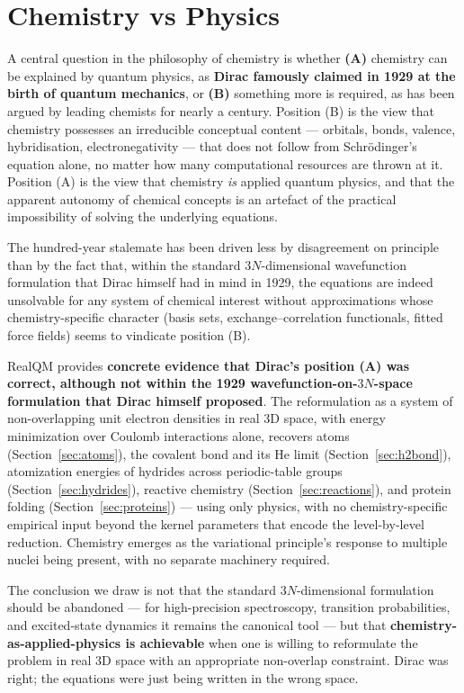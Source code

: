 \documentclass[11pt]{article}
\begin{document}
\section{Chemistry vs Physics}\label{sec:chemvphys}

A central question in the philosophy of chemistry is whether \textbf{(A)} chemistry can be explained by quantum physics, as \textbf{Dirac famously claimed in 1929 at the birth of quantum mechanics}, or \textbf{(B)} something more is required, as has been argued by leading chemists for nearly a century. Position (B) is the view that chemistry possesses an irreducible conceptual content --- orbitals, bonds, valence, hybridisation, electronegativity --- that does not follow from Schr\"odinger's equation alone, no matter how many computational resources are thrown at it. Position (A) is the view that chemistry \emph{is} applied quantum physics, and that the apparent autonomy of chemical concepts is an artefact of the practical impossibility of solving the underlying equations.

The hundred-year stalemate has been driven less by disagreement on principle than by the fact that, within the standard $3N$-dimensional wavefunction formulation that Dirac himself had in mind in 1929, the equations are indeed unsolvable for any system of chemical interest without approximations whose chemistry-specific character (basis sets, exchange--correlation functionals, fitted force fields) seems to vindicate position (B).

RealQM provides \textbf{concrete evidence that Dirac's position (A) was correct, although not within the 1929 wavefunction-on-$3N$-space formulation that Dirac himself proposed}. The reformulation as a system of non-overlapping unit electron densities in real 3D space, with energy minimization over Coulomb interactions alone, recovers atoms (Section~\ref{sec:atoms}), the covalent bond and its He limit (Section~\ref{sec:h2bond}), atomization energies of hydrides across periodic-table groups (Section~\ref{sec:hydrides}), reactive chemistry (Section~\ref{sec:reactions}), and protein folding (Section~\ref{sec:proteins}) --- using only physics, with no chemistry-specific empirical input beyond the kernel parameters that encode the level-by-level reduction. Chemistry emerges as the variational principle's response to multiple nuclei being present, with no separate machinery required.

The conclusion we draw is not that the standard $3N$-dimensional formulation should be abandoned --- for high-precision spectroscopy, transition probabilities, and excited-state dynamics it remains the canonical tool --- but that \textbf{chemistry-as-applied-physics is achievable} when one is willing to reformulate the problem in real 3D space with an appropriate non-overlap constraint. Dirac was right; the equations were just being written in the wrong space.
\end{document}
